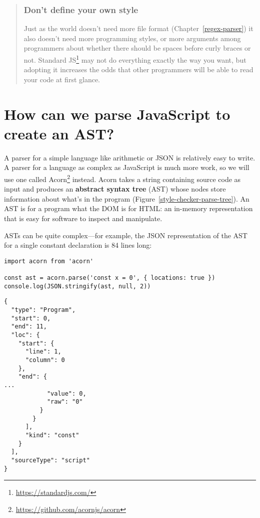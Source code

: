 \documentclass[krantzl]{krantz}
\newcommand{\chapref}[1]{Chapter~\ref{#1}}
\newcommand{\figref}[1]{Figure~\ref{#1}}
\newcommand{\glossref}[1]{\textbf{#1}}
\newenvironment{callout}{\savenotes\begin{tBox}\begin{quotation}\toggletrue{inbox}\renewcommand{\thempfootnote}{\arabic{footnote}}}{\end{quotation}\vspace{\baselineskip}\end{tBox}\togglefalse{inbox}\spewnotes}
\newcommand{\hreffoot}[2]{{#1}\footnote{\href{#2}{#2}}}
\begin{document}
\begin{callout}


\subsubsection*{Don’t define your own style}


Just as the world doesn’t need more file format (\chapref{regex-parser})
it also doesn’t need more programming styles,
or more arguments among programmers about whether there should be spaces before curly braces or not.
\hreffoot{Standard JS}{https://standardjs.com/} may not do everything exactly the way you want,
but adopting it increases the odds that other programmers will be able to read your code at first glance.

\end{callout}

\section{How can we parse JavaScript to create an AST?}\label{style-checker-ast}


A parser for a simple language like arithmetic or JSON is relatively easy to write.
A parser for a language as complex as JavaScript is much more work,
so we will use one called \hreffoot{Acorn}{https://github.com/acornjs/acorn} instead.
Acorn takes a string containing source code as input
and produces an \glossref{abstract syntax tree} (AST)
whose nodes store information about what’s in the program
(\figref{style-checker-parse-tree}).
An AST is for a program what the DOM is for HTML:
an in-memory representation that is easy for software to inspect and manipulate.


ASTs can be quite complex—for example,
the JSON representation of the AST for a single constant declaration
is 84 lines long:


\begin{lstlisting}[frame=tblr]
import acorn from 'acorn'

const ast = acorn.parse('const x = 0', { locations: true })
console.log(JSON.stringify(ast, null, 2))
\end{lstlisting}



\begin{lstlisting}[frame=tblr,backgroundcolor=\color{black!5}]
{
  "type": "Program",
  "start": 0,
  "end": 11,
  "loc": {
    "start": {
      "line": 1,
      "column": 0
    },
    "end": {
...
            "value": 0,
            "raw": "0"
          }
        }
      ],
      "kind": "const"
    }
  ],
  "sourceType": "script"
}
\end{lstlisting}
\end{document}
